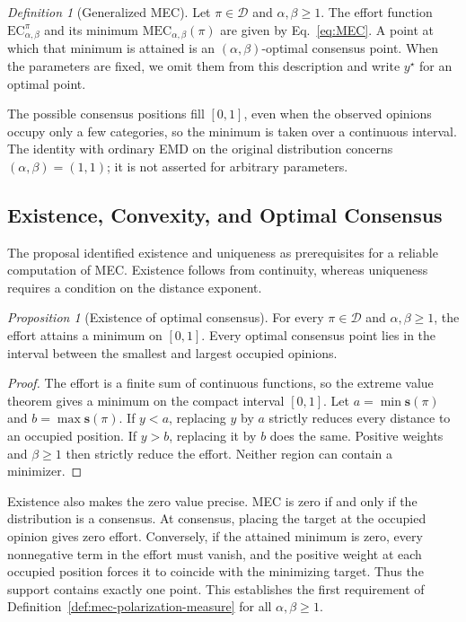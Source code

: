 \documentclass{article}
\theoremstyle{plain}
\theoremstyle{remark}
\newtheorem{definition}{Definition}
\newtheorem{proposition}{Proposition}
\begin{document}
\begin{definition}[Generalized MEC]\label{def:mec-generalized}
Let $\pi\in\mathcal{D}$ and $\alpha,\beta\geq1$. The effort function $\mathrm{EC}_{\alpha,\beta}^{\pi}$ and its minimum $\mathrm{MEC}_{\alpha,\beta}(\pi)$ are given by Eq.~\eqref{eq:MEC}. A point at which that minimum is attained is an $(\alpha,\beta)$-optimal consensus point. When the parameters are fixed, we omit them from this description and write $y^\star$ for an optimal point.
\end{definition}
The possible consensus positions fill $[0,1]$, even when the observed opinions occupy only a few categories, so the minimum is taken over a continuous interval. The identity with ordinary EMD on the original distribution concerns $(\alpha,\beta)=(1,1)$; it is not asserted for arbitrary parameters.

\subsection{Existence, Convexity, and Optimal Consensus}\label{subsec:mec-convexity}

The proposal identified existence and uniqueness as prerequisites for a reliable computation of MEC. Existence follows from continuity, whereas uniqueness requires a condition on the distance exponent.

\begin{proposition}[Existence of optimal consensus]\label{prop:mec-existence}
For every $\pi\in\mathcal{D}$ and $\alpha,\beta\geq1$, the effort attains a minimum on $[0,1]$. Every optimal consensus point lies in the interval between the smallest and largest occupied opinions.
\end{proposition}
\begin{proof}
The effort is a finite sum of continuous functions, so the extreme value theorem gives a minimum on the compact interval $[0,1]$. Let $a=\min\boldsymbol{s}(\pi)$ and $b=\max\boldsymbol{s}(\pi)$. If $y<a$, replacing $y$ by $a$ strictly reduces every distance to an occupied position. If $y>b$, replacing it by $b$ does the same. Positive weights and $\beta\geq1$ then strictly reduce the effort. Neither region can contain a minimizer.
\end{proof}

Existence also makes the zero value precise. MEC is zero if and only if the distribution is a consensus. At consensus, placing the target at the occupied opinion gives zero effort. Conversely, if the attained minimum is zero, every nonnegative term in the effort must vanish, and the positive weight at each occupied position forces it to coincide with the minimizing target. Thus the support contains exactly one point. This establishes the first requirement of Definition~\ref{def:mec-polarization-measure} for all $\alpha,\beta\geq1$.
\end{document}
